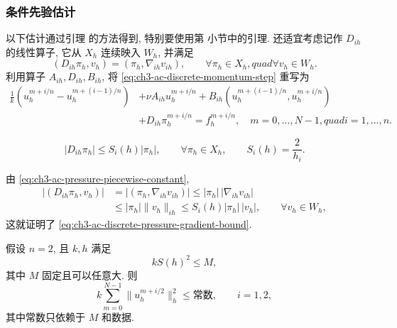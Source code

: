 \subsubsection{条件先验估计}
\label{subsubsec:ch3-ac-conditional-estimates}

以下估计通过引理  的方法得到, 特别要使用第  小节中的引理. 还适宜考虑记作 $D_{ih}$ 的线性算子, 它从 $X_h$ 连续映入 $W_h$, 并满足
\begin{equation}
(D_{ih}\pi_h,v_h)=(\pi_h,\nabla_{ih}v_{ih}),
\qquad\forall\pi_h\in X_h,quad\forall v_h\in W_h.
\label{eq:ch3-ac-discrete-pressure-gradient-operator}
\end{equation}
利用算子 $A_{ih},D_{ih},B_{ih}$, 将 \eqref{eq:ch3-ac-discrete-momentum-step} 重写为
\begin{equation}
\begin{aligned}
\frac1k(u_h^{m+i/n}-u_h^{m+(i-1)/n})
&+\nu A_{ih}u_h^{m+i/n}
+B_{ih}(u_h^{m+(i-1)/n},u_h^{m+i/n})\\
&+D_{ih}\pi_h^{m+i/n}=f_h^{m+i/n},
\quad m=0,\ldots,N-1,quad i=1,\ldots,n.
\end{aligned}
\label{eq:ch3-ac-discrete-operator-form}
\end{equation}

\begin{Lemma}
\label{lem:ch3-ac-discrete-pressure-gradient-bound}
\begin{equation}
|D_{ih}\pi_h|\leq S_i(h)|\pi_h|,
\qquad\forall\pi_h\in X_h,
\qquad S_i(h)=\frac2{h_i}.
\label{eq:ch3-ac-discrete-pressure-gradient-bound}
\end{equation}
\end{Lemma}

\begin{Proof}
由 \eqref{eq:ch3-ac-pressure-piecewise-constant},
\[
\begin{aligned}
|(D_{ih}\pi_h,v_h)|
&=|(\pi_h,\nabla_{ih}v_{ih})|
\leq|\pi_h|\,|\nabla_{ih}v_{ih}|\\
&\leq|\pi_h|\lVert v_h\rVert_{ih}
\leq S_i(h)|\pi_h|\,|v_h|,
\qquad\forall v_h\in W_h,
\end{aligned}
\]
这就证明了 \eqref{eq:ch3-ac-discrete-pressure-gradient-bound}.
\end{Proof}

\begin{Lemma}
\label{lem:ch3-ac-conditional-estimate-two-dimensional}
假设 $n=2$, 且 $k,h$ 满足
\begin{equation}
kS(h)^2\leq M,
\label{eq:ch3-ac-stability-condition-two-dimensional}
\end{equation}
其中 $M$ 固定且可以任意大. 则
\begin{equation}
k\sum_{m=0}^{N-1}\lVert u_h^{m+i/2}\rVert_h^2
\leq\text{常数},
\qquad i=1,2,
\label{eq:ch3-ac-conditional-h1-two-dimensional}
\end{equation}
其中常数只依赖于 $M$ 和数据.
\end{Lemma}

